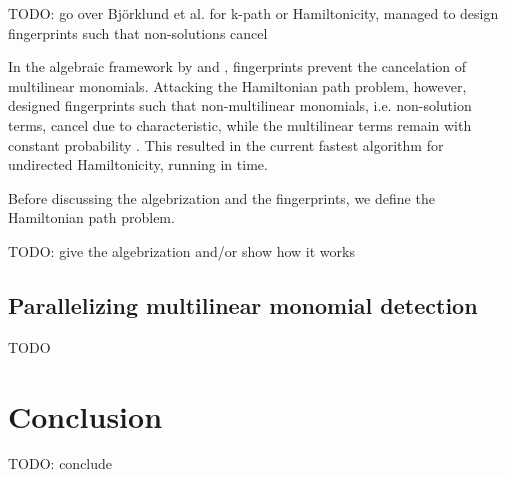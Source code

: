 TODO: go over Björklund et al. for k-path or Hamiltonicity, managed to design fingerprints such that non-solutions cancel

In the algebraic framework by \citeauthor{Koutis08} and \citeauthor{Williams09}, 
fingerprints prevent the cancelation of multilinear monomials. 
Attacking the Hamiltonian path problem, however, \citeauthor{Björklund14} 
designed fingerprints such that non-multilinear monomials, i.e. non-solution terms, 
cancel due to characteristic, while the multilinear terms 
remain with constant probability \cite{Björklund14}. This resulted in the current 
fastest algorithm for undirected Hamiltonicity, running in  time.

Before discussing the algebrization and the fingerprints, 
we define the Hamiltonian path problem.

\begin{problem}
\end{problem}

TODO: give the algebrization and/or show how it works

\subsection{Parallelizing multilinear monomial detection}
\label{sect:parallelization}


TODO

\section{Conclusion}

TODO: conclude